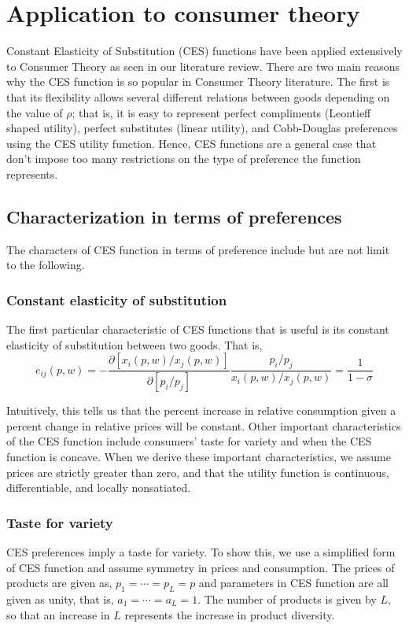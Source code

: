 \section{Application to consumer theory}
Constant Elasticity of Substitution (CES) functions have been applied extensively to Consumer Theory as seen in our literature review. There are two main reasons why the CES function is so popular in Consumer Theory literature. The first is that its flexibility allows several different relations between goods depending on the value of $\rho$; that is, it is easy to represent perfect compliments (Leontieff shaped utility), perfect substitutes (linear utility), and Cobb-Douglas preferences using the CES utility function. Hence, CES functions are a general case that don't impose too many restrictions on the type of preference the function represents.
\subsection{Characterization in terms of preferences}
The characters of CES function in terms of preference include but are not limit to the following.
\subsubsection{Constant elasticity of substitution}
The first particular characteristic of CES functions that is useful is its constant elasticity of substitution between two goods. That is,\\

$$e_{ij}\left( p,w\right) = - \dfrac{\partial\left[ x_{i}\left( p,w\right)/x_{j}\left( p,w\right) \right] }{\partial\left[ p_{i}/p_{j}\right]} \dfrac{p_{i}/p_{j}}{x_{i}\left( p,w\right)/x_{j}\left( p,w\right)}=\dfrac{1}{1-\sigma}$$

Intuitively, this tells us that the percent increase in relative consumption given a percent change in relative prices will be constant.
Other important characteristics of the CES function include consumers' taste for variety and when the CES function is concave. When we derive these important characteristics, we assume prices are strictly greater than zero, and that the utility function is continuous, differentiable, and locally nonsatiated.
\subsubsection{Taste for variety}
CES preferences imply a taste for variety. To show this, we use a simplified form of CES function and assume symmetry in prices and consumption. The prices of products are given as, $p_1 = \cdots = p_L = p$ and parameters in CES function are all given as unity, that is, $a_1 = \cdots = a_L = 1$. The number of products is given by $L$, so that an increase in $L$ represents the increase in product diversity.

